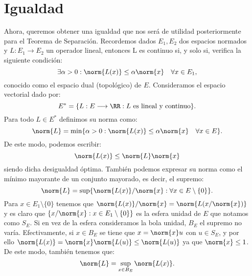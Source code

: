 \chapter{Igualdad}
\newcommand{\normSpace}{E}
	
Ahora, queremos obtener una igualdad que nos será de utilidad posteriormente para el Teorema de Separación. Recordemos dados $ \normSpace_1, \normSpace_2 $ dos espacios normados y $ L:\normSpace_1 \longrightarrow \normSpace_2 $ un operador lineal, entonces L es continuo si, y solo si, verifica la siguiente condición:
\[
\exists \alpha > 0 : \norm{L(x)} \leq \alpha \norm{x} \quad \forall x \in \normSpace_1,
\]
conocido como el espacio dual (topológico) de $ E $.
Consideramos el espacio vectorial dado por:
\[
\normSpace^* =  \lbrace L:\normSpace \longrightarrow \RR: L \text{ es lineal y continuo} \rbrace.
\]
Para todo $ L \in \normSpace^* $ definimos su norma como:
\[
\norm{L} = \min \lbrace \alpha > 0:  \norm{L(x)} \leq \alpha \norm{x} \quad \forall x \in \normSpace\rbrace.
\]
De este modo, podemos escribir:
\begin{equation*}\label{desigNorma}
	\norm{L(x)} \leq \norm{L} \norm{x}
\end{equation*}
siendo dicha desigualdad óptima. También podemos expresar su norma como el mínimo mayorante de un conjunto mayorado, es decir, el supremo:
\[
\norm{L} = \sup \lbrace \norm{L(x)}/\norm{x} : \forall x \in \normSpace \setminus \{0\}\rbrace.
\]
Para $  x \in \normSpace_1 \setminus \{0\} $ tenemos que $ \norm{L(x)}/\norm{x} = \norm{L(x/\norm{x})}$ y es claro que $ \{ x/\norm{x} : x \in \normSpace_1 \setminus \{0\}\} $ es la esfera unidad de $ \normSpace $ que notamos como $ S_\normSpace $. Si en vez de la esfera consideramos la bola unidad, $ B_\normSpace $ el supremo no varía. Efectivamente, si $ x \in B_\normSpace  $ se tiene que $ x = \norm{x}u $ con $ u \in  S_\normSpace$, y por ello $ \norm{L(x)} = \norm{x}\norm{L(u)} \leq \norm{L(u)} $ ya que $ \norm{x} \leq 1 $. De este modo, también tenemos que:
\begin{equation*}\label{normSup}
	\norm{L} =\sup_{x \in B_\normSpace} \norm{L(x)}.
\end{equation*}

